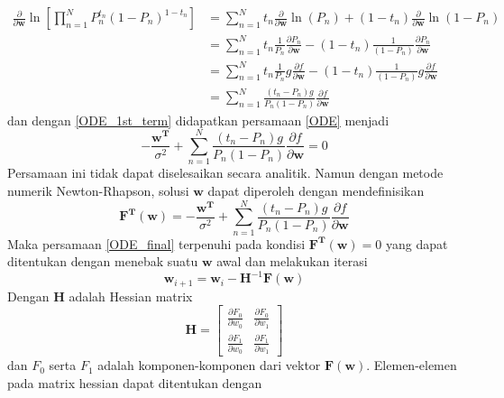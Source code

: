 \begin{align*}
    \frac{\partial}{\partial{\mathbf{w}}} \ln{\left[ \prod_{n=1}^{N} P_n^{t_n}\left(1-P_n\right)^{1-t_n} \right] } & = \sum_{n=1}^{N} t_n \frac{\partial}{\partial{\mathbf{w}}}\ln{(P_n)} + (1-t_n) \frac{\partial}{\partial{\mathbf{w}}} \ln{(1-P_n)} \\
    & = \sum_{n=1}^{N} t_n \frac{1}{P_n} \frac{\partial{P_n}}{\partial{\mathbf{w}}} - (1-t_n) \frac{1}{(1-P_n)} \frac{\partial{P_n}}{\partial{\mathbf{w}}} \\
    & = \sum_{n=1}^{N} t_n \frac{1}{P_n} g \frac{\partial{f}}{\partial{\mathbf{w}}} - (1-t_n) \frac{1}{(1-P_n)} g \frac{\partial{f}}{\partial{\mathbf{w}}} \\
    & = \sum_{n=1}^{N} \frac{(t_n-P_n)g}{P_n(1-P_n)} \frac{\partial{f}}{\partial{\mathbf{w}}}
\end{align*}
dan dengan \ref{ODE_1st_term} didapatkan persamaan \ref{ODE} menjadi
\begin{equation}
    -\frac{\mathbf{w^T}}{\sigma^2}+\sum_{n=1}^{N} \frac{(t_n-P_n)g}{P_n(1-P_n)} \frac{\partial{f}}{\partial{\mathbf{w}}}=0 \label{ODE_final}
\end{equation}
Persamaan ini tidak dapat diselesaikan secara analitik. Namun dengan metode numerik Newton-Rhapson, solusi $\mathbf{w}$ dapat diperoleh dengan mendefinisikan
\begin{equation}
    \mathbf{F^T}(\mathbf{w}) = -\frac{\mathbf{w^T}}{\sigma^2}+\sum_{n=1}^{N} \frac{(t_n-P_n)g}{P_n(1-P_n)} \frac{\partial{f}}{\partial{\mathbf{w}}} \label{F_vec}
\end{equation}
Maka persamaan \ref{ODE_final} terpenuhi pada kondisi $\mathbf{F^T}(\mathbf{w}) = 0$ yang dapat ditentukan dengan menebak suatu $\mathbf{w}$ awal dan melakukan iterasi
\begin{equation}
    \mathbf{w}_{i+1} = \mathbf{w}_{i} - \mathbf{H}^{-1}\mathbf{F}(\mathbf{w}) \label{iter}
\end{equation}
Dengan $\mathbf{H}$ adalah Hessian matrix
\begin{equation}
    \mathbf{H} = 
    \begin{bmatrix}
    \frac{\partial{F_0}}{\partial{w_0}} & \frac{\partial{F_0}}{\partial{w_1}} \\
    \frac{\partial{F_1}}{\partial{w_0}} & \frac{\partial{F_1}}{\partial{w_1}} 
    \end{bmatrix} \label{H_mat}
\end{equation}
dan $F_0$ serta $F_1$ adalah komponen-komponen dari vektor $\mathbf{F}(\mathbf{w})$. Elemen-elemen pada matrix hessian dapat ditentukan dengan
